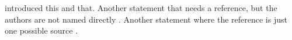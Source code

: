 \citet{Bishop2006} introduced this and that. Another statement that needs a reference, but the authors are not named directly \citep{Bishop2006}. Another statement where the reference is just one possible source \citep[see, e.g.,][]{Bishop2006}. 